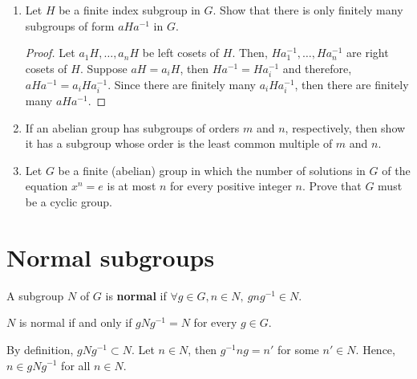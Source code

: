 \begin{enumerate}
\begin{proof}
        \begin{align*}
            (H \cap K)c_{r_1}a_{i_1} = (H \cap K)  c_{r_2}a_{i_2} &\implies a_{i_1} = a_{i_2}, (H \cap K)  c_{r_1} = (H \cap K)  c_{r_2}\\
            &\implies a_{i_1} = a_{i_2}, c_{r_1} = c_{r_2}
        \end{align*}
        As a result, \(\squareBracket{G:H \cap K} = \squareBracket{G:H} \squareBracket{H:H\cap K}\).
        \end{proof}
    \item Let \(H\) be a finite index subgroup in \(G\). Show that there is only finitely many subgroups of form \(aHa^{-1}\) in \(G\).
    \begin{proof}
        Let \(a_1H, \dots, a_nH\) be left cosets of \(H\). Then, \(Ha_1^{-1}, \dots, Ha_n^{-1}\) are right cosets of \(H\). Suppose \(aH = a_iH\), then \(Ha^{-1} = Ha_i^{-1}\) and therefore, \(aHa^{-1} = a_{i} H a_{i}^{-1}\). Since there are finitely many \(a_i H a_i^{-1}\), then there are finitely many \(aHa^{-1}\).
    \end{proof}
    \item If an abelian group has subgroups of orders \(m\) and \(n\), respectively, then show it has a subgroup whose order is the least common multiple of \(m\) and \(n\).
    \item Let \(G\) be a finite (abelian) group in which the number of solutions in \(G\) of the equation \(x^n = e\) is at most \(n\) for every positive integer \(n\). Prove that \(G\) must be a cyclic group.
\end{enumerate}


\section{Normal subgroups}
\begin{definition}
    A subgroup \(N\) of \(G\) is \textbf{normal} if \(\forall g \in G,n \in N,\ gng^{-1} \in N\).
\end{definition}

\begin{lemma}\label{lm:normalEquivalency}
    \(N\) is normal if and only if \(gNg^{-1} = N\) for every \(g \in G\).
\end{lemma}

\begin{prooflemma}
    By definition, \(gNg^{-1} \subset N\). Let \(n \in N\), then \(g^{-1}ng = n'\) for some \(n' \in N\). Hence, \(n \in gNg^{-1}\) for all \(n \in N\).
\end{prooflemma}

